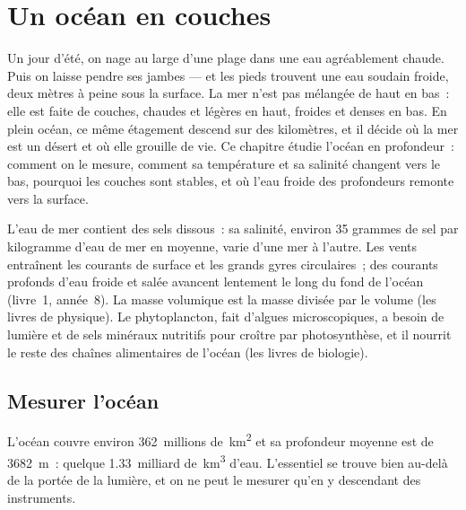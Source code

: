 \chapter{Un océan en couches}\label{ch:g10:layered-ocean}

Un jour d'été, on nage au large d'une plage dans une eau agréablement
chaude. Puis on laisse pendre ses jambes --- et les pieds trouvent une eau
soudain froide, deux mètres à peine sous la surface. La mer n'est pas
mélangée de haut en bas~: elle est faite de couches, chaudes et légères en
haut, froides et denses en bas. En plein océan, ce même étagement descend
sur des kilomètres, et il décide où la mer est un désert et où elle
grouille de vie. Ce chapitre étudie l'océan en profondeur~: comment on le
mesure, comment sa température et sa salinité changent vers le bas,
pourquoi les couches sont stables, et où l'eau froide des profondeurs
remonte vers la surface.

\begin{recall}
L'eau de mer contient des sels dissous~: sa salinité, environ 35 grammes de
sel par kilogramme d'eau de mer en moyenne, varie d'une mer à l'autre. Les
vents entraînent les courants de surface et les grands gyres circulaires~;
des courants profonds d'eau froide et salée avancent lentement le long du
fond de l'océan (livre~1, année~8). La masse volumique est la masse divisée
par le volume (les livres de physique). Le phytoplancton, fait d'algues
microscopiques, a besoin de lumière et de sels minéraux nutritifs pour
croître par photosynthèse, et il nourrit le reste des chaînes alimentaires
de l'océan (les livres de biologie).
\end{recall}

\section{Mesurer l'océan}

L'océan couvre environ \num{362}~millions de~\unit{km^2} et sa profondeur
moyenne est de \qty{3682}{m}~: quelque \num{1.33}~milliard de~\unit{km^3}
d'eau. L'essentiel se trouve bien au-delà de la portée de la lumière, et on
ne peut le mesurer qu'en y descendant des instruments.


